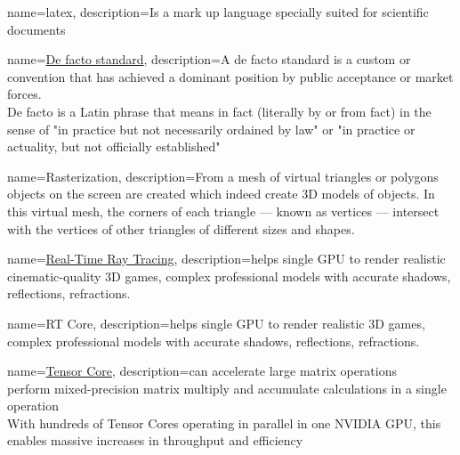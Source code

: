 {
	name=latex,
	description={Is a mark up language specially suited 
		for scientific documents}
}

{
	name=\href{https://en.wikipedia.org/wiki/De_facto_standard}{De facto standard},
	description={A de facto standard is a custom or convention that has achieved a dominant position by public acceptance or market forces.
    \\  De facto is a Latin phrase that means in fact (literally by or from fact) in the sense of "in practice but not necessarily ordained by law" or "in practice or actuality, but not officially established"
	}
}

{
	name=Rasterization,
	description={From a mesh of virtual triangles or polygons objects on the screen are created which indeed create 3D models of objects. In this virtual mesh, the corners of each triangle — known as vertices — intersect with the vertices of other triangles of different sizes and shapes.}
}

{
    name=\href{https://developer.nvidia.com/rtx/raytracing}{Real-Time Ray Tracing},
    description=helps single GPU to render realistic cinematic-quality 3D games, complex professional models with accurate shadows, reflections, refractions.
}

{
    name=RT Core,
    description=helps single GPU to render realistic 3D games, complex professional models with accurate shadows, reflections, refractions.
}

{
    name=\href{https://www.nvidia.com/en-us/data-center/tensorcore/}{Tensor Core},
    description=can accelerate large matrix operations
\\ perform mixed-precision matrix multiply and accumulate calculations in a single operation
\\ With hundreds of Tensor Cores operating in parallel in one NVIDIA GPU, this enables massive increases in throughput and efficiency
}